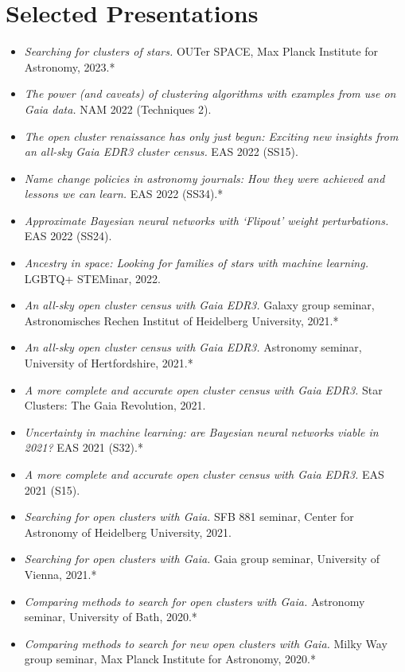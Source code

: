 \documentclass[12pt, letterpaper]{hunt-cv}
\begin{document}
\section*{Selected Presentations}

\begin{itemize}
    \item \emph{Searching for clusters of stars.} OUTer SPACE, Max Planck Institute for Astronomy, 2023.*\cross
    \item \emph{The power (and caveats) of clustering algorithms with examples from use on Gaia data.} NAM 2022 (Techniques 2).
    \item \emph{The open cluster renaissance has only just begun: Exciting new insights from an all-sky Gaia EDR3 cluster census.} EAS 2022 (SS15).
    \item \emph{Name change policies in astronomy journals: How they were achieved and lessons we can learn.} EAS 2022 (SS34).*
    \item \emph{Approximate Bayesian neural networks with `Flipout' weight perturbations.} EAS 2022 (SS24).
    \item \emph{Ancestry in space: Looking for families of stars with machine learning.} LGBTQ+ STEMinar, 2022.\cross
    \item \emph{An all-sky open cluster census with Gaia EDR3.} Galaxy group seminar, Astronomisches Rechen Institut of Heidelberg University, 2021.*
    \item \emph{An all-sky open cluster census with Gaia EDR3.} Astronomy seminar, University of Hertfordshire, 2021.*
    \item \emph{A more complete and accurate open cluster census with Gaia EDR3.} Star Clusters: The Gaia Revolution, 2021.
    \item \emph{Uncertainty in machine learning: are Bayesian neural networks viable in 2021?} EAS 2021 (S32).*
    \item \emph{A more complete and accurate open cluster census with Gaia EDR3.} EAS 2021 (S15).
    \item \emph{Searching for open clusters with Gaia.} SFB 881 seminar, Center for Astronomy of Heidelberg University, 2021.
    \item \emph{Searching for open clusters with Gaia.} Gaia group seminar, University of Vienna, 2021.*
    \item \emph{Comparing methods to search for open clusters with Gaia.} Astronomy seminar, University of Bath, 2020.*
    \item \emph{Comparing methods to search for new open clusters with Gaia.} Milky Way group seminar, Max Planck Institute for Astronomy, 2020.*
\end{itemize}
\end{document}
